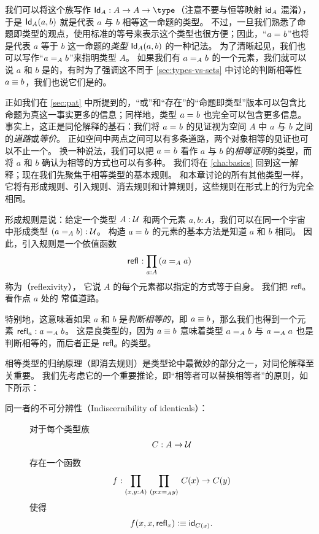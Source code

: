 我们可以将这个族写作 $\idtypevar{A}:A\to A\to\type$（注意不要与恒等映射 $\idfunc[A]$ 混淆），于是 $\idtype[A]ab$ 就是代表 $a$ 与 $b$ 相等这一命题的类型。
不过，一旦我们熟悉了命题即类型的观点，使用标准的等号来表示这个类型也很方便；因此，``$\id{a}{b}$''也将是代表 $a$ 等于 $b$ 这一命题的\emph{类型} $\idtype[A]ab$ 的一种记法。
为了清晰起见，我们也可以写作``$\id[A]{a}{b}$''来指明类型 $A$。
如果我们有 $\id[A]{a}{b}$ 的一个元素，我们就可以说 $a$ 和 $b$ 是的，有时为了强调这不同于 \cref{sec:types-vs-sets} 中讨论的判断相等性 $a\jdeq b$，我们也说它们是的。
%
%

正如我们在 \cref{sec:pat} 中所提到的，``或''和``存在''的``命题即类型''版本可以包含比命题为真这一事实更多的信息；同样地，类型 $\id{a}{b}$ 也完全可以包含更多信息。
事实上，这正是同伦解释的基石：我们将 $\id{a}{b}$ 的见证视为空间 $A$ 中 $a$ 与 $b$ 之间的\emph{道路}或\emph{等价}。
正如空间中两点之间可以有多条道路，两个对象相等的见证也可以不止一个。
换一种说法，我们可以把 $\id{a}{b}$ 看作 $a$ 与 $b$ 的\emph{相等证明}的类型，而将 $a$ 和 $b$ 确认为相等的方式也可以有多种。
我们将在 \cref{cha:basics} 回到这一解释；现在我们先聚焦于相等类型的基本规则。
和本章讨论的所有其他类型一样，它将有形成规则、引入规则、消去规则和计算规则，这些规则在形式上的行为完全相同。

形成规则是说：给定一个类型 $A:\UU$ 和两个元素 $a,b:A$，我们可以在同一个宇宙中形成类型 $(\id[A]{a}{b}):\UU$。
构造 $\id{a}{b}$ 的元素的基本方法是知道 $a$ 和 $b$ 相同。
因此，引入规则是一个依值函数
\[\refl{} : \prd{a:A} (\id[A]{a}{a})\]
称为（reflexivity），
%
它说 $A$ 的每个元素都以指定的方式等于自身。
我们把 $\refl{a}$ 看作点 $a$ 处的
常值道路。

特别地，这意味着如果 $a$ 和 $b$ 是\emph{判断相等的}，即 $a\jdeq b$，那么我们也得到一个元素 $\refl{a} : \id[A]{a}{b}$。
这是良类型的，因为 $a\jdeq b$ 意味着类型 $\id[A]{a}{b}$ 与 $\id[A]{a}{a}$ 也是判断相等的，而后者正是 $\refl{a}$ 的类型。

相等类型的归纳原理（即消去规则）是类型论中最微妙的部分之一，对同伦解释至关重要。
我们先考虑它的一个重要推论，即``相等者可以替换相等者''的原则，如下所示：
%
%

\begin{description}
\item[同一者的不可分辨性（Indiscernibility of identicals）：]
对于每个类型族
\[
C : A \to \UU
\]
存在一个函数
\[
f : \prd{x,y:A}{p:\id[A] x y} C(x) \to C(y)
\]
使得
\[
f(x,x,\refl{x}) \defeq \idfunc[C(x)].
\]
\end{description}

